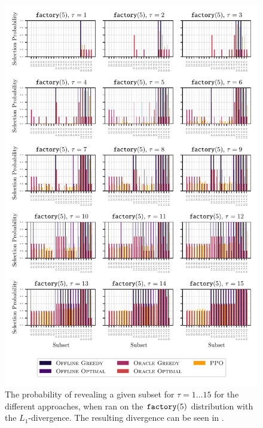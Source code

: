 \begin{figure}[t!]
  \centering
	\includegraphics[width=\textwidth]{figures/l1_norm_predictible_factory5_coalition_bars.pdf}
	\caption{ The probability of revealing a given subset for $\tau=1\ldots 15$ for the different approaches, when ran on the $\factory[5]$ distribution with the $ L_1 $-divergence. 
		The resulting divergence can be seen in .
	}
\end{figure}

